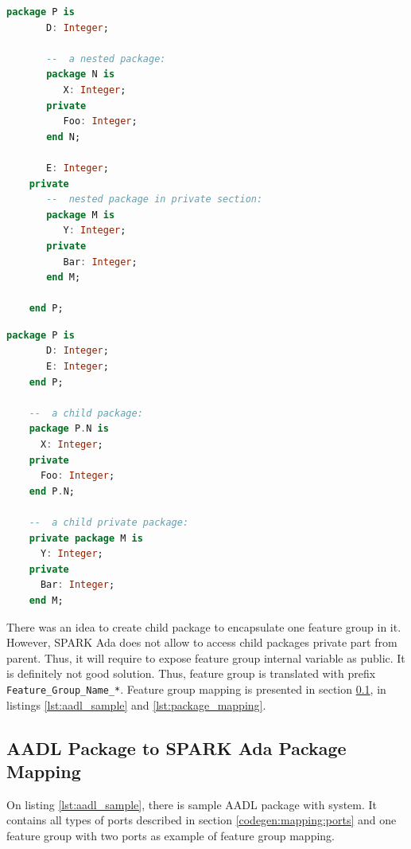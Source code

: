 \singlespacing
\begin{lstlisting}[language=ada, frame=single, gobble=0, caption={Nested packages in SPARK Ada}, label={lst:nested_packages}]
	package P is
	   D: Integer;

	   --  a nested package:
	   package N is
	      X: Integer;
	   private
	      Foo: Integer;
	   end N;

	   E: Integer;
	private
	   --  nested package in private section:
	   package M is
	      Y: Integer;
	   private
	      Bar: Integer;
	   end M;

	end P;
\end{lstlisting}
\doublespacing

\singlespacing
\begin{lstlisting}[language=ada, frame=single, gobble=0, caption={Child packages in SPARK Ada}, label={lst:child_packages}]
	package P is
	   D: Integer;
	   E: Integer;
	end P;

	--  a child package:
	package P.N is
      X: Integer;
   	private
      Foo: Integer;
	end P.N;

	--  a child private package:
	private package M is
	  Y: Integer;
	private
	  Bar: Integer;
	end M;
\end{lstlisting}
\doublespacing

There was an idea to create child package to encapsulate one feature group in it. However, SPARK Ada does not allow to access child packages private part from parent. Thus, it will require to expose feature group internal variable as public. It is definitely not good solution. Thus, feature group is translated with prefix \lstinline{Feature_Group_Name_*}. Feature group mapping is presented in section \ref{codegen:mapping:packages}, in listings \ref{lst:aadl_sample} and \ref{lst:package_mapping}.


\subsection{AADL Package to SPARK Ada Package Mapping}
\label{codegen:mapping:packages}

On listing \ref{lst:aadl_sample}, there is sample AADL package with system. It contains all types of ports described in section \ref{codegen:mapping:ports} and one feature group with two ports as example of feature group mapping.

